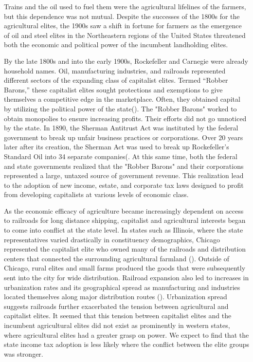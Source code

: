 \documentclass[letter, 12pt]{article}
\begin{document}
Trains and the oil used to fuel them were the agricultural lifelines of the farmers, but this dependence was not mutual. Despite the successes of the 1800s for the agricultural elites, the 1900s saw a shift in fortune for farmers as the emergence of oil and steel elites in the Northeastern regions of the United States threatened both the economic and political power of the incumbent landholding elites. 

By the late 1800s and into the early 1900s, Rockefeller and Carnegie were already household names. Oil, manufacturing industries, and railroads represented different sectors of the expanding class of capitalist elites. Termed “Robber Barons,” these capitalist elites sought protections and exemptions to give themselves a competitive edge in the marketplace. Often, they obtained capital by utilizing the political power of the state(\citealt{folsom1991myth}). The "Robber Barons" worked to obtain monopolies to ensure increasing profits. Their efforts did not go unnoticed by the state. In 1890, the Sherman Antitrust Act was instituted by the federal government to break up unfair business practices or corporations. Over 20 years later after its creation, the Sherman Act was used to break up Rockefeller’s Standard Oil into 34 separate companies(\citealt{mcgee1958predatory}. At this same time, both the federal and state governments realized that the "Robber Barons" and their corporations represented a large, untaxed source of government revenue. This realization lead to the adoption of new income, estate, and corporate tax laws designed to profit from developing capitalists at various levels of economic class.

As the economic efficacy of agriculture became increasingly dependent on access to railroads for long distance shipping, capitalist and agricultural interests began to come into conflict at the state level. In states such as Illinois, where the state representatives varied drastically in constituency demographics, Chicago represented the capitalist elite who owned many of the railroads and distribution centers that connected the surrounding agricultural farmland (\citealt{scott1979land}). Outside of Chicago, rural elites and small farms produced the goods that were subsequently sent into the city for wide distribution. Railroad expansion also led to increases in urbanization rates and its geographical spread as manufacturing and industries located themselves along major distribution routes (\citealt{atack2010did}). Urbanization spread suggests railroads further exacerbated the tension between agricultural and capitalist elites. It seemed that this tension between capitalist elites and the incumbent agricultural elites did not exist as prominently in western states, where agricultural elites had a greater grasp on power. We expect to find that the state income tax adoption is less likely where the conflict between the elite groups was stronger.
\end{document}
